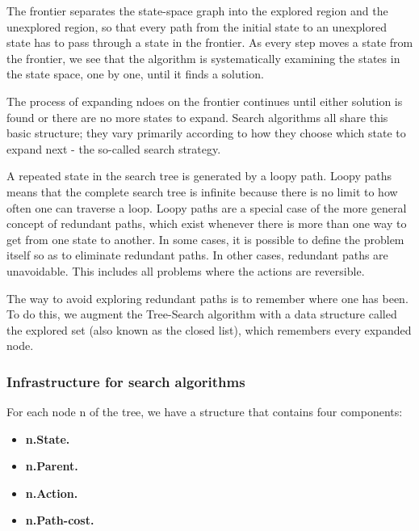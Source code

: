\documentclass{article}
\begin{document}
The frontier separates the state-space graph into the explored region and the unexplored region, so that every path from the initial state to an unexplored state has to pass through a state in the frontier. As every step moves a state from the frontier, we see that the algorithm is systematically examining the states in the state space, one by one, until it finds a solution.

The process of expanding ndoes on the frontier continues until either solution is found or there are no more states to expand. Search algorithms all share this basic structure; they vary primarily according to how they choose which state to expand next - the so-called search strategy.

A repeated state in the search tree is generated by a loopy path. Loopy paths means that the complete search tree is infinite because there is no limit to how often one can traverse a loop. Loopy paths are a special case of the more general concept of redundant paths, which exist whenever there is more than one way to get from one state to another. In some cases, it is possible to define the problem itself so as to eliminate redundant paths. In other cases, redundant paths are unavoidable. This includes all problems where the actions are reversible. 

The way to avoid exploring redundant paths is to remember where one has been. To do this, we augment the Tree-Search algorithm with a data structure called the explored set (also known as the closed list), which remembers every expanded node.

\subsubsection{Infrastructure for search algorithms}

For each node n of the tree, we have a structure that contains four components:

\begin{itemize}
    \item \textbf{n.State.}
    \item \textbf{n.Parent.}
    \item \textbf{n.Action.}
    \item \textbf{n.Path-cost.}
\end{itemize}
\end{document}
